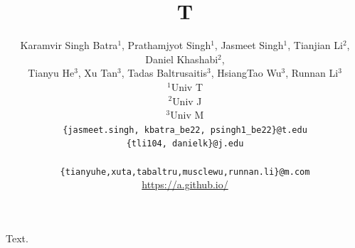 \documentclass{article}
\title{T}
\author{Karamvir Singh Batra$^{1}$, Prathamjyot Singh$^{1}$, Jasmeet Singh$^{1}$, Tianjian Li$^{2}$, Daniel Khashabi$^{2}$, \\
Tianyu He$^{3}$, Xu Tan$^{3}$, Tadas Baltrusaitis$^{3}$, HsiangTao Wu$^{3}$, Runnan Li$^{3}$ \\
$^{1}$Univ T \\ $^{2}$Univ J \\ $^{3}$Univ M \\
\texttt{\{jasmeet.singh, kbatra\_be22, psingh1\_be22\}@t.edu} \\
\texttt{\{tli104, danielk\}@j.edu} \\ \vspace{2pt} \\
\texttt{\{tianyuhe,xuta,tabaltru,musclewu,runnan.li\}@m.com} \\
\href{https://a.github.io/}{https://a.github.io/}}
\begin{document}
\maketitle
Text.
\end{document}
